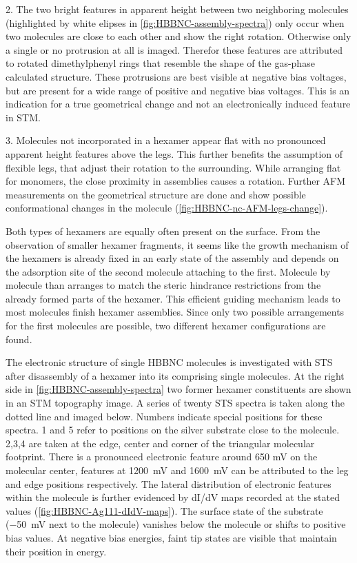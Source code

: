2. The two bright features in apparent height between two neighboring molecules (highlighted by white elipses in \autoref{fig:HBBNC-assembly-spectra}) only occur when two molecules are close to each other and show the right rotation. Otherwise only a single or no protrusion at all is imaged. Therefor these features are attributed to rotated dimethylphenyl rings that resemble the shape of the gas-phase calculated structure. These protrusions are best visible at negative bias voltages, but are present for a wide range of positive and negative bias voltages. This is an indication for a true geometrical change and not an electronically induced feature in STM.

3. Molecules not incorporated in a hexamer appear flat with no pronounced apparent height features above the legs. This further benefits the assumption of flexible legs, that adjust their rotation to the surrounding. While arranging flat for monomers, the close proximity in assemblies causes a rotation. Further AFM measurements on the geometrical structure are done and show possible conformational changes in the molecule (\autoref{fig:HBBNC-nc-AFM-legs-change}).

Both types of hexamers are equally often present on the surface. From the observation of smaller hexamer fragments, it seems like the growth mechanism of the hexamers is already fixed in an early state of the assembly and depends on the adsorption site of the second molecule attaching to the first. Molecule by molecule than arranges to match the steric hindrance restrictions from the already formed parts of the hexamer. This efficient guiding mechanism leads to most molecules finish hexamer assemblies. Since only two possible arrangements for the first molecules are possible, two different hexamer configurations are found.

The electronic structure of single HBBNC molecules is investigated with STS after disassembly of a hexamer into its comprising single molecules. At the right side in \autoref{fig:HBBNC-assembly-spectra} two former hexamer constituents are shown in an STM topography image. A series of twenty STS spectra is taken along the dotted line and imaged below. Numbers indicate special positions for these spectra. 1 and 5 refer to positions on the silver substrate close to the molecule. 2,3,4 are taken at the edge, center and corner of the triangular molecular footprint. There is a pronounced electronic feature around 650 mV on the molecular center, features at \SI{1200}{\milli \volt} and \SI{1600}{\milli \volt} can be attributed to the leg and edge positions respectively. The lateral distribution of electronic features within the molecule is further evidenced by dI/dV maps recorded at the stated values (\autoref{fig:HBBNC-Ag111-dIdV-maps}).
The surface state of the substrate (\SI{-50}{\milli \volt} next to the molecule) vanishes below the molecule or shifts to positive bias values. At negative bias energies, faint tip states are visible that maintain their position in energy. 

